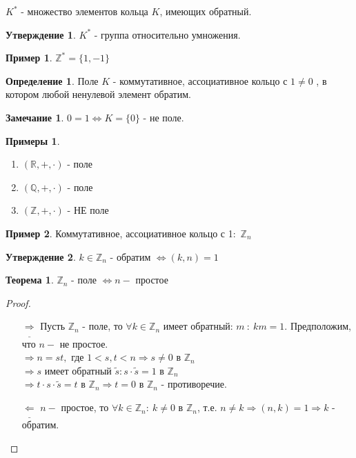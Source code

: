 \documentclass[a4paper, 12pt]{article}
\newcommand{\R}{\mathbb R}
\newcommand{\Q}{\mathbb Q}
\newcommand{\Z}{\mathbb Z}
\newcommand\tab[1][.5cm]{\hspace*{#1}}
\theoremstyle{definition}
\newtheorem*{definition}{Определение}
\newtheorem*{theorem}{Теорема}
\newtheorem*{subtheorem}{Утверждение}
\newtheorem*{remark}{Замечание}
\newtheorem*{example}{Примеры}
\newtheorem*{example1}{Пример}
\begin{document}
  $K^*$ - множество элементов кольца $K$, имеющих обратный. 
  \begin{subtheorem}
    $K^*$ - группа относительно умножения. 
  \end{subtheorem}  
  \begin{example1}
    $\Z^* = \{1, -1\}$
  \end{example1}
  \begin{definition}
    Поле $K$ - коммутативное, ассоциативное кольцо с $1 \neq 0$ , в котором любой ненулевой элемент обратим.
  \end{definition} 
  \begin{remark}
    $0 = 1 \Longleftrightarrow K = \{0\}$ - не поле.
  \end{remark} 
  \begin{example}\tab
    \begin{enumerate}
      \item $(\R, +, \cdot)$ - поле
      \item $(\Q, +, \cdot)$ - поле
      \item $(\Z, +, \cdot)$ - НЕ поле   
    \end{enumerate}
  \end{example}
  \begin{example1}
    Коммутативное, ассоциативное кольцо с 1:\  $\Z_n$ 
  \end{example1}
  \begin{subtheorem}
    $k \in \Z_n$ - обратим $\Longleftrightarrow (k, n) = 1$  
  \end{subtheorem} 
  \begin{theorem}
    $\Z_n$ - поле $\Longleftrightarrow n - $ простое 
  \end{theorem} 
  \begin{proof}\tab
    \begin{itemize}
      \item[$\underline{\Longrightarrow }$] Пусть $\Z_n$ - поле, то $\forall k \in \Z_n$ имеет обратный: $m \ : \ km=1$. Предположим, что $n - $ не простое.\\
      $\Longrightarrow n = st, $ где $1<s, t<n \Longrightarrow s \neq 0$ в $\Z_n$\\
      $\Longrightarrow s $ имеет обратный $\widetilde{s} : s \cdot \widetilde{s} = 1$ в $\Z_n$\\
      $\Longrightarrow t \cdot s \cdot \widetilde{s} = t $ в $
      \Z_n \Longrightarrow t=0$ в $\Z_n$ - противоречие.
      \item[$\underline{\Longleftarrow  }$] $n -$ простое, то $\forall k \in \Z_n: \ k \neq 0$ в $\Z_n$, т.е. $n \neq k \Longrightarrow (n, k) = 1 \Longrightarrow k$ - обратим.  
    \end{itemize}
  \end{proof}
\end{document}

